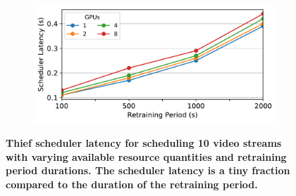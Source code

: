 \begin{figure}
  \centering
  \begin{subfigure}[t]{\linewidth}
    \centering
    \includegraphics[width=\linewidth]{results/sensitivity/scheduler_resourcetime.pdf}
  \end{subfigure}
  \caption{\small \bf Thief scheduler latency for scheduling 10 video streams with varying available resource quantities and retraining period durations. The scheduler latency is a tiny fraction compared to the duration of the retraining period.  }
  \label{fig:sensitivity-schedlatency}
\end{figure}


